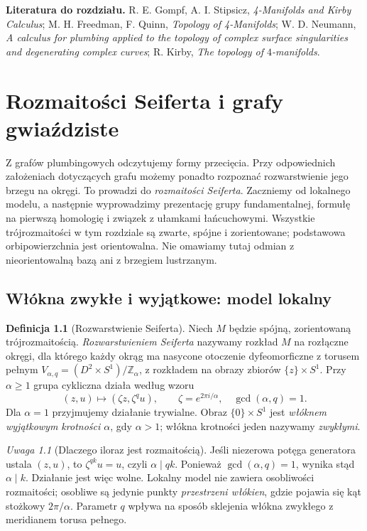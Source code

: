 \documentclass[11pt,a4paper]{report}
\numberwithin{equation}{section}
\theoremstyle{plain}
\theoremstyle{definition}
\newtheorem{definicja}[twierdzenie]{Definicja}
\theoremstyle{remark}
\newtheorem{uwaga}[twierdzenie]{Uwaga}
\begin{document}
\medskip
\noindent\textbf{Literatura do rozdziału.}
R. E. Gompf, A. I. Stipsicz, \emph{4-Manifolds and Kirby Calculus};
M. H. Freedman, F. Quinn, \emph{Topology of 4-Manifolds};
W. D. Neumann, \emph{A calculus for plumbing applied to the
topology of complex surface singularities and degenerating complex
curves}; R. Kirby, \emph{The topology of $4$-manifolds}.


\chapter{Rozmaitości Seiferta i grafy gwiaździste}
\label{ch:tg-seifert}

Z grafów plumbingowych odczytujemy formy przecięcia.
Przy odpowiednich założeniach dotyczących grafu możemy
ponadto rozpoznać rozwarstwienie jego brzegu na okręgi.
To prowadzi do \emph{rozmaitości Seiferta}. Zaczniemy od lokalnego
modelu, a następnie wyprowadzimy prezentację grupy fundamentalnej,
formułę na pierwszą homologię i związek z ułamkami łańcuchowymi.
Wszystkie trójrozmaitości w tym rozdziale są zwarte, spójne i zorientowane;
podstawowa orbipowierzchnia jest orientowalna. Nie omawiamy tutaj
odmian z nieorientowalną bazą ani z brzegiem lustrzanym.

\section{Włókna zwykłe i wyjątkowe: model lokalny}
\label{sec:tg-seifert-model}

\begin{definicja}[Rozwarstwienie Seiferta]
Niech $M$ będzie spójną, zorientowaną trójrozmaitością.
\emph{Rozwarstwieniem Seiferta} nazywamy rozkład $M$ na rozłączne
okręgi, dla którego każdy okrąg ma nasycone otoczenie dyfeomorficzne
z torusem pełnym $V_{\alpha,q}=(D^2\times S^1)/\mathbb Z_\alpha$,
z rozkładem na obrazy zbiorów $\{z\}\times S^1$.
Przy $\alpha\geq1$ grupa cykliczna działa według wzoru
\[
(z,u)\longmapsto(\zeta z,\zeta^q u),\qquad
\zeta=e^{2\pi i/\alpha},\quad \gcd(\alpha,q)=1.
\]
Dla $\alpha=1$ przyjmujemy działanie trywialne. Obraz
$\{0\}\times S^1$ jest \emph{włóknem wyjątkowym krotności $\alpha$},
gdy $\alpha>1$; włókna krotności jeden nazywamy \emph{zwykłymi}.
\end{definicja}

\begin{uwaga}[Dlaczego iloraz jest rozmaitością]
Jeśli niezerowa potęga generatora ustala $(z,u)$, to
$\zeta^{qk}u=u$, czyli $\alpha\mid qk$. Ponieważ
$\gcd(\alpha,q)=1$, wynika stąd $\alpha\mid k$.
Działanie jest więc wolne. Lokalny model nie zawiera
osobliwości rozmaitości; osobliwe są jedynie punkty
\emph{przestrzeni włókien}, gdzie pojawia się kąt stożkowy
$2\pi/\alpha$. Parametr $q$ wpływa na sposób sklejenia
włókna zwykłego z meridianem torusa pełnego.
\end{uwaga}
\end{document}

